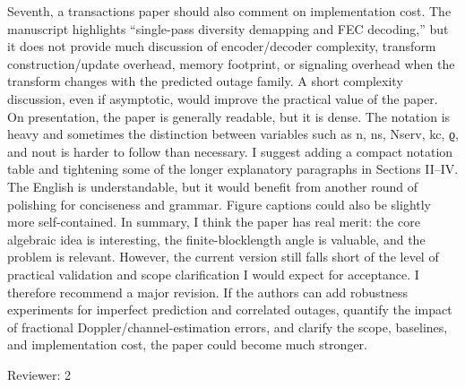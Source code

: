 Seventh, a transactions paper should also comment on implementation cost. The manuscript highlights “single-pass diversity demapping and FEC decoding,” but it does not provide much discussion of encoder/decoder complexity, transform construction/update overhead, memory footprint, or signaling overhead when the transform changes with the predicted outage family. A short complexity discussion, even if asymptotic, would improve the practical value of the paper.
On presentation, the paper is generally readable, but it is dense. The notation is heavy and sometimes the distinction between variables such as n, ns, Nserv, kc, ϱ, and nout is harder to follow than necessary. I suggest adding a compact notation table and tightening some of the longer explanatory paragraphs in Sections II–IV. The English is understandable, but it would benefit from another round of polishing for conciseness and grammar. Figure captions could also be slightly more self-contained.
In summary, I think the paper has real merit: the core algebraic idea is interesting, the finite-blocklength angle is valuable, and the problem is relevant. However, the current version still falls short of the level of practical validation and scope clarification I would expect for acceptance. I therefore recommend a major revision. If the authors can add robustness experiments for imperfect prediction and correlated outages, quantify the impact of fractional Doppler/channel-estimation errors, and clarify the scope, baselines, and implementation cost, the paper could become much stronger.


Reviewer: 2


